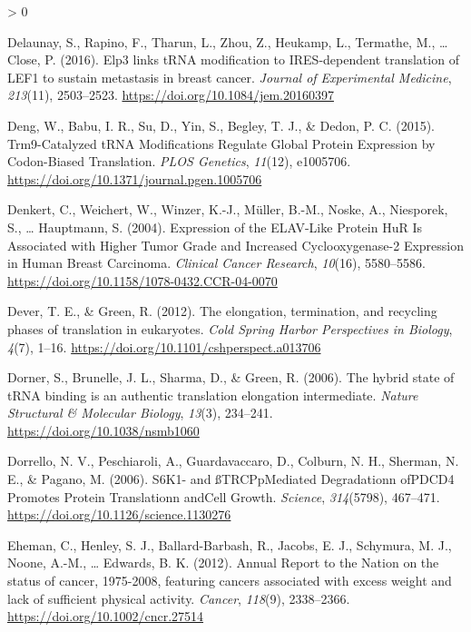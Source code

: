 \documentclass[
  12pt,
  openany]{book}
\newlength{\cslhangindent}
\newenvironment{CSLReferences}[2] %
 {%
  \setlength{\parindent}{0pt}
  \ifodd #1 \everypar{\setlength{\hangindent}{\cslhangindent}}\ignorespaces\fi
  \ifnum #2 > 0
  \setlength{\parskip}{#2\baselineskip}
  \fi
 }%
 {}
\begin{document}
\begin{CSLReferences}{1}{0}
\leavevmode\hypertarget{ref-Delaunay2016}{}%
Delaunay, S., Rapino, F., Tharun, L., Zhou, Z., Heukamp, L., Termathe, M., \ldots{} Close, P. (2016). Elp3 links {tRNA} modification to {IRES}-dependent translation of {LEF1} to sustain metastasis in breast cancer. \emph{Journal of Experimental Medicine}, \emph{213}(11), 2503--2523. \url{https://doi.org/10.1084/jem.20160397}

\leavevmode\hypertarget{ref-Deng2015}{}%
Deng, W., Babu, I. R., Su, D., Yin, S., Begley, T. J., \& Dedon, P. C. (2015). Trm9-{Catalyzed tRNA Modifications Regulate Global Protein Expression} by {Codon}-{Biased Translation}. \emph{PLOS Genetics}, \emph{11}(12), e1005706. \url{https://doi.org/10.1371/journal.pgen.1005706}

\leavevmode\hypertarget{ref-Denkert2004}{}%
Denkert, C., Weichert, W., Winzer, K.-J., Müller, B.-M., Noske, A., Niesporek, S., \ldots{} Hauptmann, S. (2004). Expression of the {ELAV}-{Like Protein HuR Is Associated} with {Higher Tumor Grade} and {Increased Cyclooxygenase}-2 {Expression} in {Human Breast Carcinoma}. \emph{Clinical Cancer Research}, \emph{10}(16), 5580--5586. \url{https://doi.org/10.1158/1078-0432.CCR-04-0070}

\leavevmode\hypertarget{ref-Dever2012}{}%
Dever, T. E., \& Green, R. (2012). The elongation, termination, and recycling phases of translation in eukaryotes. \emph{Cold Spring Harbor Perspectives in Biology}, \emph{4}(7), 1--16. \url{https://doi.org/10.1101/cshperspect.a013706}

\leavevmode\hypertarget{ref-Dorner2006}{}%
Dorner, S., Brunelle, J. L., Sharma, D., \& Green, R. (2006). The hybrid state of {tRNA} binding is an authentic translation elongation intermediate. \emph{Nature Structural \& Molecular Biology}, \emph{13}(3), 234--241. \url{https://doi.org/10.1038/nsmb1060}

\leavevmode\hypertarget{ref-Dorrello2006}{}%
Dorrello, N. V., Peschiaroli, A., Guardavaccaro, D., Colburn, N. H., Sherman, N. E., \& Pagano, M. (2006). {S6K1}- and {ßTRCP}p{Mediated Degradation}n of{PDCD4 Promotes Protein Translation}n and{Cell Growth}. \emph{Science}, \emph{314}(5798), 467--471. \url{https://doi.org/10.1126/science.1130276}

\leavevmode\hypertarget{ref-Eheman2012}{}%
Eheman, C., Henley, S. J., Ballard-Barbash, R., Jacobs, E. J., Schymura, M. J., Noone, A.-M., \ldots{} Edwards, B. K. (2012). Annual {Report} to the {Nation} on the status of cancer, 1975-2008, featuring cancers associated with excess weight and lack of sufficient physical activity. \emph{Cancer}, \emph{118}(9), 2338--2366. \url{https://doi.org/10.1002/cncr.27514}


\end{CSLReferences}
\end{document}
